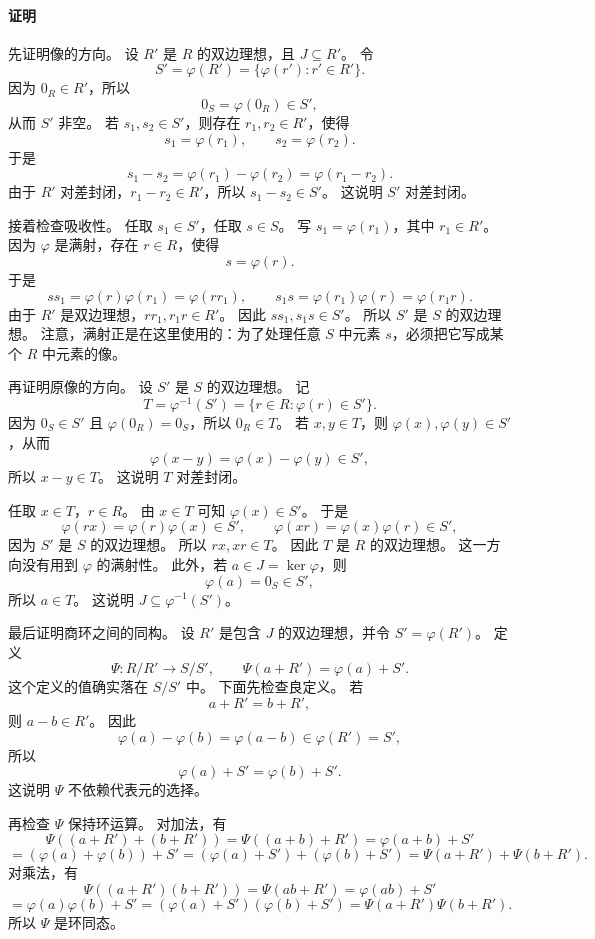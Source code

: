 \paragraph*{证明}
先证明像的方向。
设 $R'$ 是 $R$ 的双边理想，且 $J\subseteq R'$。
令
\[
S'=\varphi(R')=\{\varphi(r'):r'\in R'\}.
\]
因为 $0_R\in R'$，所以
\[
0_S=\varphi(0_R)\in S',
\]
从而 $S'$ 非空。
若 $s_1,s_2\in S'$，则存在 $r_1,r_2\in R'$，使得
\[
s_1=\varphi(r_1),\qquad s_2=\varphi(r_2).
\]
于是
\[
s_1-s_2=\varphi(r_1)-\varphi(r_2)=\varphi(r_1-r_2).
\]
由于 $R'$ 对差封闭，$r_1-r_2\in R'$，所以 $s_1-s_2\in S'$。
这说明 $S'$ 对差封闭。

接着检查吸收性。
任取 $s_1\in S'$，任取 $s\in S$。
写 $s_1=\varphi(r_1)$，其中 $r_1\in R'$。
因为 $\varphi$ 是满射，存在 $r\in R$，使得
\[
s=\varphi(r).
\]
于是
\[
ss_1=\varphi(r)\varphi(r_1)=\varphi(rr_1),
\qquad
s_1s=\varphi(r_1)\varphi(r)=\varphi(r_1r).
\]
由于 $R'$ 是双边理想，$rr_1,r_1r\in R'$。
因此 $ss_1,s_1s\in S'$。
所以 $S'$ 是 $S$ 的双边理想。
注意，满射正是在这里使用的：为了处理任意 $S$ 中元素 $s$，必须把它写成某个 $R$ 中元素的像。

再证明原像的方向。
设 $S'$ 是 $S$ 的双边理想。
记
\[
T=\varphi^{-1}(S')=\{r\in R:\varphi(r)\in S'\}.
\]
因为 $0_S\in S'$ 且 $\varphi(0_R)=0_S$，所以 $0_R\in T$。
若 $x,y\in T$，则 $\varphi(x),\varphi(y)\in S'$，从而
\[
\varphi(x-y)=\varphi(x)-\varphi(y)\in S',
\]
所以 $x-y\in T$。
这说明 $T$ 对差封闭。

任取 $x\in T$，$r\in R$。
由 $x\in T$ 可知 $\varphi(x)\in S'$。
于是
\[
\varphi(rx)=\varphi(r)\varphi(x)\in S',
\qquad
\varphi(xr)=\varphi(x)\varphi(r)\in S',
\]
因为 $S'$ 是 $S$ 的双边理想。
所以 $rx,xr\in T$。
因此 $T$ 是 $R$ 的双边理想。
这一方向没有用到 $\varphi$ 的满射性。
此外，若 $a\in J=\ker\varphi$，则
\[
\varphi(a)=0_S\in S',
\]
所以 $a\in T$。
这说明 $J\subseteq \varphi^{-1}(S')$。

最后证明商环之间的同构。
设 $R'$ 是包含 $J$ 的双边理想，并令 $S'=\varphi(R')$。
定义
\[
\Psi:R/R'\to S/S',
\qquad
\Psi(a+R')=\varphi(a)+S'.
\]
这个定义的值确实落在 $S/S'$ 中。
下面先检查良定义。
若
\[
a+R'=b+R',
\]
则 $a-b\in R'$。
因此
\[
\varphi(a)-\varphi(b)=\varphi(a-b)\in \varphi(R')=S',
\]
所以
\[
\varphi(a)+S'=\varphi(b)+S'.
\]
这说明 $\Psi$ 不依赖代表元的选择。

再检查 $\Psi$ 保持环运算。
对加法，有
\[
\Psi((a+R')+(b+R'))
=\Psi((a+b)+R')
=\varphi(a+b)+S'
\]
\[
=(\varphi(a)+\varphi(b))+S'
=(\varphi(a)+S')+(\varphi(b)+S')
=\Psi(a+R')+\Psi(b+R').
\]
对乘法，有
\[
\Psi((a+R')(b+R'))
=\Psi(ab+R')
=\varphi(ab)+S'
\]
\[
=\varphi(a)\varphi(b)+S'
=(\varphi(a)+S')(\varphi(b)+S')
=\Psi(a+R')\Psi(b+R').
\]
所以 $\Psi$ 是环同态。

